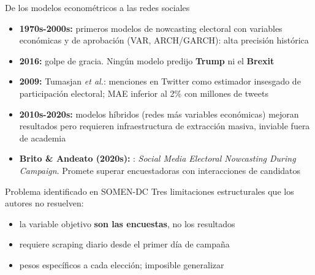 \begin{frame}{De los modelos econométricos a las redes sociales}
  \begin{itemize}
    \item \textbf{1970s-2000s:} primeros modelos de nowcasting electoral con variables
          económicas y de aprobación (VAR, ARCH/GARCH): alta precisión histórica
    \item \textbf{2016:} golpe de gracia. Ningún modelo predijo \textbf{Trump} ni el \textbf{Brexit}
    \item \textbf{2009:} Tumasjan \textit{et al.}: menciones en Twitter como estimador insesgado
          de participación electoral; MAE inferior al 2\% con millones de tweets
    \item \textbf{2010s-2020s:} modelos híbridos (redes más variables económicas) mejoran resultados
          pero requieren infraestructura de extracción masiva, inviable fuera de academia
    \item \textbf{Brito \& Andeato (2020s):} : \textit{Social Media Electoral Nowcasting
          During Campaign}. Promete superar encuestadoras con interacciones de candidatos
  \end{itemize}

  \vspace{0.4em}
  \begin{alertblock}{Problema identificado en SOMEN-DC}
    Tres limitaciones estructurales que los autores no resuelven:
    \begin{itemize}
      \item {} la variable objetivo \textbf{son las encuestas}, no los resultados
      \item {} requiere scraping diario desde el primer día de campaña
      \item {} pesos específicos a cada elección; imposible generalizar
    \end{itemize}
  \end{alertblock}
\end{frame}
